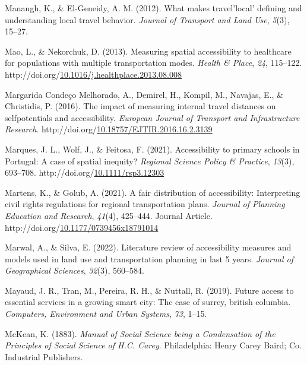 \documentclass[
11pt, %
oneside, %
english, %
singlespacing, %
]{macthesis} %
\newlength{\cslhangindent}
\newenvironment{CSLReferences}[2] %
{\begin{list}{}{%
	\setlength{\itemindent}{0pt}
	\setlength{\leftmargin}{0pt}
	\setlength{\parsep}{0pt}
	\ifodd #1
	\setlength{\leftmargin}{\cslhangindent}
	\setlength{\itemindent}{-1\cslhangindent}
	\fi
	\setlength{\itemsep}{#2\baselineskip}}}
{\end{list}}
\begin{document}
\begin{CSLReferences}{1}{0}
Manaugh, K., \& El-Geneidy, A. M. (2012). What makes travel'local' defining and understanding local travel behavior. \emph{Journal of Transport and Land Use}, \emph{5}(3), 15--27.

Mao, L., \& Nekorchuk, D. (2013). Measuring spatial accessibility to healthcare for populations with multiple transportation modes. \emph{Health \& Place}, \emph{24}, 115--122. http://doi.org/\href{https://doi.org/10.1016/j.healthplace.2013.08.008}{10.1016/j.healthplace.2013.08.008}

Margarida Condeço Melhorado, A., Demirel, H., Kompil, M., Navajas, E., \& Christidis, P. (2016). The impact of measuring internal travel distances on selfpotentials and accessibility. \emph{European Journal of Transport and Infrastructure Research}. http://doi.org/\href{https://doi.org/10.18757/EJTIR.2016.16.2.3139}{10.18757/EJTIR.2016.16.2.3139}

Marques, J. L., Wolf, J., \& Feitosa, F. (2021). Accessibility to primary schools in {Portugal}: A case of spatial inequity? \emph{Regional Science Policy \& Practice}, \emph{13}(3), 693--708. http://doi.org/\href{https://doi.org/10.1111/rsp3.12303}{10.1111/rsp3.12303}

Martens, K., \& Golub, A. (2021). A fair distribution of accessibility: Interpreting civil rights regulations for regional transportation plans. \emph{Journal of Planning Education and Research}, \emph{41}(4), 425--444. Journal Article. http://doi.org/\href{https://doi.org/10.1177/0739456x18791014}{10.1177/0739456x18791014}

Marwal, A., \& Silva, E. (2022). Literature review of accessibility measures and models used in land use and transportation planning in last 5 years. \emph{Journal of Geographical Sciences}, \emph{32}(3), 560--584.

Mayaud, J. R., Tran, M., Pereira, R. H., \& Nuttall, R. (2019). Future access to essential services in a growing smart city: The case of surrey, british columbia. \emph{Computers, Environment and Urban Systems}, \emph{73}, 1--15.

McKean, K. (1883). \emph{Manual of {Social} {Science} being a {Condensation} of the {Principles} of {Social} {Science} of {H}.{C}. {Carey}}. Philadelphia: Henry Carey Baird; Co. Industrial Publishers.


\end{CSLReferences}
\end{document}
